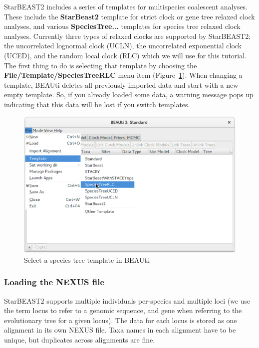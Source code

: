 \documentclass{article}
\begin{document}
StarBEAST2 includes a series of templates for multispecies coalescent analyses.
These include the \textbf{StarBeast2} template for strict clock or gene tree
relaxed clock analyses, and various \textbf{SpeciesTree...} templates for species tree
relaxed clock analyses. Currently three types of relaxed clocks are supported by
StarBEAST2; the uncorrelated lognormal clock (UCLN), the uncorrelated
exponential clock (UCED), and the random local clock (RLC) which we will use for
this tutorial.  The first thing to do is selecting that template by choosing the
\textbf{File/Template/SpeciesTreeRLC} menu item (Figure~\ref{fig:sb2Template}).
When changing a template, BEAUti deletes all previously imported data and start
with a new empty template. So, if you already loaded some data, a warning
message pops up indicating that this data will be lost if you switch templates.

\begin{figure}[htb!]
\centering
\includegraphics[width=\textwidth]{figures/beauti-rlc.png}
\caption{Select a species tree template in BEAUti.}
\label{fig:sb2Template}
\end{figure}

\subsubsection*{Loading the NEXUS file}

StarBEAST2 supports multiple individuals per-species and multiple loci (we use
the term locus to refer to a genomic sequence, and gene when referring to the
evolutionary tree for a given locus). The data for each locus is stored as one
alignment in its own NEXUS file. Taxa names in each alignment have to be unique,
but duplicates across alignments are fine.
\end{document}
